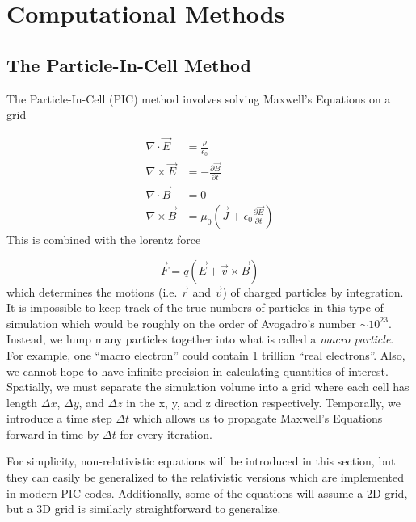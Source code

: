 \chapter{Computational Methods} \label{ch:3}

\section{The Particle-In-Cell Method}

The Particle-In-Cell (PIC) method involves solving Maxwell's Equations on a grid 

\begin{align}
	\nabla \cdot \vec{E} &= \frac{\rho}{\epsilon_0}  \label{eq:gauss} \\
	\nabla \times \vec{E} &= - \frac{\partial \vec{B}}{\partial t} \label{eq:faraday} \\
	\nabla \cdot \vec{B} &= 0 \label{eq:gauss_magnetism} \\
	\nabla \times \vec{B} &= \mu_0 (\vec{J} + \epsilon_0 \frac{\partial \vec{E}}{\partial t}) \label{eq:ampere}
\end{align}
This is combined with the lorentz force

\begin{equation}
	\vec{F} = q(\vec{E} + \vec{v} \times \vec{B}) \label{eq:lorentz_pic}
\end{equation}
which determines the motions (i.e. $\vec{r}$ and $\vec{v}$) of charged particles by integration. It is impossible to keep track of the true numbers of particles in this type of simulation which would be roughly on the order of Avogadro's number $\sim 10^{23}$. Instead, we lump many particles together into what is called a \emph{macro particle}. For example, one ``macro electron'' could contain 1 trillion ``real electrons''. Also, we cannot hope to have infinite precision in calculating quantities of interest. Spatially, we must separate the simulation volume into a grid where each cell has length $\Delta x$, $\Delta y$, and $\Delta z$ in the x, y, and z direction respectively. Temporally, we introduce a time step $\Delta t$ which allows us to propagate Maxwell's Equations forward in time by $\Delta t$ for every iteration.

For simplicity, non-relativistic equations will be introduced in this section, but they can easily be generalized to the relativistic versions which are implemented in modern PIC codes. Additionally, some of the equations will assume a 2D grid, but a 3D grid is similarly straightforward to generalize.

